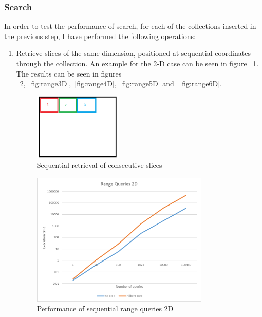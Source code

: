 \documentclass[11pt, a4paper, oneside]{article}
\begin{document}
\subsubsection*{Search}
In order to test the performance of search, for each of the collections inserted in the previous step, I have performed the following operations:
\begin{enumerate}
\item Retrieve slices of the same dimension, positioned at sequential coordinates through the collection. An example for the 2-D case can be seen in figure ~\ref{fig:search2}. The results can be seen in figures ~\ref{fig:range2D},~\ref{fig:range3D},~\ref{fig:range4D},~\ref{fig:range5D} and ~\ref{fig:range6D}.

\begin{figure}[H]
  \centering
    \includegraphics[width=0.4\textwidth]{img/search2}
      \caption{Sequential retrieval of consecutive slices}
  \label{fig:search2}
\end{figure}

\begin{figure}[H]
  \centering
    \includegraphics[width=0.8\textwidth]{img/range2d}
      \caption{Performance of sequential range queries 2D }
  \label{fig:range2D}
\end{figure}


\end{enumerate}
\end{document}
